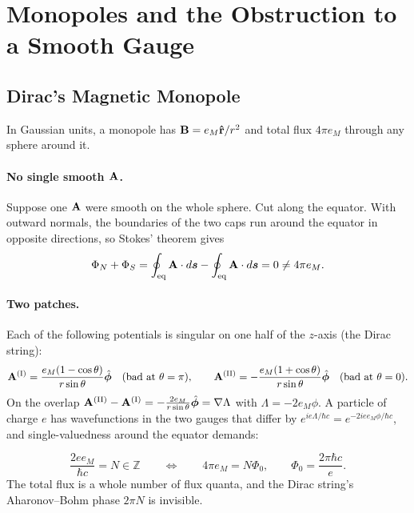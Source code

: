 \section{Monopoles and the Obstruction to a Smooth Gauge}

\subsection{Dirac's Magnetic Monopole}

In Gaussian units, a monopole has $\cvect{B} = e_M\rhat/r^2$ and total flux $4\pi e_M$ through any sphere around it.

\paragraph{No single smooth $\cvect{A}$.} Suppose one $\cvect{A}$ were smooth on the whole sphere. Cut along the equator. With outward normals, the boundaries of the two caps run around the equator in opposite directions, so Stokes' theorem gives
\[
    \Phi_N + \Phi_S = \oint_{\text{eq}}\cvect{A}\cdot d\lvect{s} - \oint_{\text{eq}}\cvect{A}\cdot d\lvect{s} = 0\neq4\pi e_M .
\]

\paragraph{Two patches.} Each of the following potentials is singular on one half of the $z$-axis (the Dirac string):
\[
    \cvect{A}^{(\mathrm{I})} = \frac{e_M(1-\cos\theta)}{r\sin\theta}\hat{\bm{\phi}}\quad(\text{bad at }\theta = \pi),
    \qquad
    \cvect{A}^{(\mathrm{II})} = -\frac{e_M(1+\cos\theta)}{r\sin\theta}\hat{\bm{\phi}}\quad(\text{bad at }\theta = 0).
\]
On the overlap $\cvect{A}^{(\mathrm{II})} - \cvect{A}^{(\mathrm{I})} = -\frac{2e_M}{r\sin\theta}\hat{\bm{\phi}} = \nabla\Lambda$ with $\Lambda = -2e_M\phi$. A particle of charge $e$ has wavefunctions in the two gauges that differ by $e^{ie\Lambda/\hbar c} = e^{-2iee_M\phi/\hbar c}$, and single-valuedness around the equator demands:

\begin{theorem}
\[
    \frac{2ee_M}{\hbar c} = N\in\mathbb{Z}
    \qquad\Longleftrightarrow\qquad
    4\pi e_M = N\Phi_0,
    \qquad
    \Phi_0 = \frac{2\pi\hbar c}{e}.
\]
The total flux is a whole number of flux quanta, and the Dirac string's Aharonov--Bohm phase $2\pi N$ is invisible.
\end{theorem}


